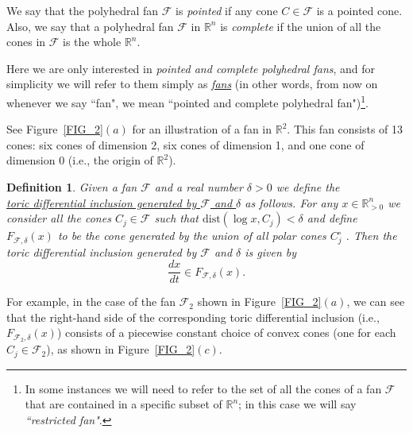 \documentclass[12pt,letterpaper]{article}
\newtheorem{defn}[thm]{Definition}
\newcommand{\F}{\mathcal{F}}
\newcommand{\RR}{\mathbb{R}}
\begin{document}
We say that the polyhedral fan $\F$ is {\em pointed} if any cone $C \in \F$ is a pointed cone. Also, we say that a polyhedral fan $\F$ in $\RR^n$ is {\em complete} if the union of all the cones in $\F$ is the whole $\RR^n$. 

Here we are only interested in {\em pointed and complete polyhedral fans}, and for simplicity we will refer to them simply as \underline{{\em fans}} (in other words, from now on whenever we say ``fan", we mean ``pointed and complete polyhedral fan")\footnote{In some instances we will need to refer to the set of all the cones of a fan $\F$ that are contained in a specific subset of $\RR^n$; in this case we will say {\em ``restricted fan"}.}. 






    
See Figure~\ref{FIG_2}$(a)$  for an illustration of a fan in $\RR^2$. This fan consists of 13 cones: six cones of dimension 2, six cones of dimension 1, and one cone of dimension 0 (i.e., the origin of $\RR^2$). 












\begin{defn}

Given a  fan $\mathcal{F}$ and a real number $\delta > 0$ we  define the \\ \underline{toric differential inclusion generated by $\mathcal{F}$ and $\delta$} as follows.
%
For any $x \in \mathbb{R}^n_{>0}$ we consider all the cones  $C_j \in \mathcal{F}$ such that $\text{dist}(\log x, C_j) < \delta$ and define ${F}_{\mathcal{F}, \delta}(x)$ to be the cone generated by the union of all polar cones $C_j^\circ$ .
%
Then the toric differential inclusion generated by $\mathcal{F}$ and $\delta$ is given by 
\begin{equation}
\label{TDI}
\frac{dx}{dt} \in {F}_{\mathcal{F}, \delta}(x). 
\end{equation}
\end{defn}

\bigskip

For example, in the case of the fan $\mathcal{F}_2$ 
shown in Figure~\ref{FIG_2}$(a)$, 
we can see that the right-hand side of the corresponding toric differential inclusion (i.e., ${F}_{\mathcal{F}_2, \delta}(x)$) consists of a piecewise constant choice of convex cones (one for each $C_j \in \mathcal{F}_2$), as shown in Figure~\ref{FIG_2}$(c)$.
\end{document}
